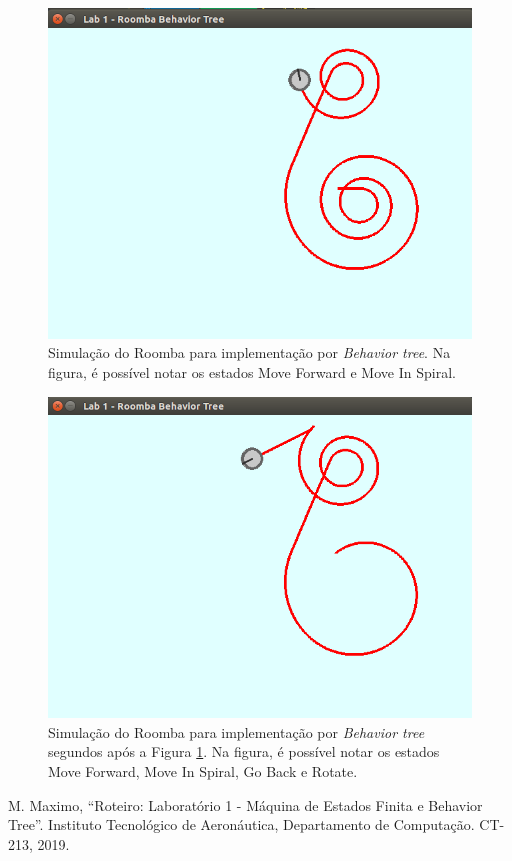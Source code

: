 \documentclass[conference]{IEEEtran}
\begin{document}
\begin{figure}[htbp]
\centerline{\includegraphics[scale=0.4]{test_behavior_tree_1.png}}
\caption{Simulação do Roomba para implementação por \textit{Behavior tree}. Na figura, é possível notar os estados Move Forward e Move In Spiral.}
\label{test_behavior_tree_1}
\end{figure}

\begin{figure}[htbp]
\centerline{\includegraphics[scale=0.4]{test_behavior_tree_2.png}}
\caption{Simulação do Roomba para implementação por \textit{Behavior tree} segundos após a Figura \ref{test_behavior_tree_1}. Na figura, é possível notar os estados Move Forward, Move In Spiral, Go Back e Rotate.}
\label{test_behavior_tree_2}
\end{figure}

\begin{thebibliography}{00}
 M. Maximo, ``Roteiro: Laboratório 1 - Máquina de Estados Finita e Behavior Tree''. Instituto Tecnológico de Aeronáutica, Departamento de Computação. CT-213, 2019.
\end{thebibliography}
\end{document}
